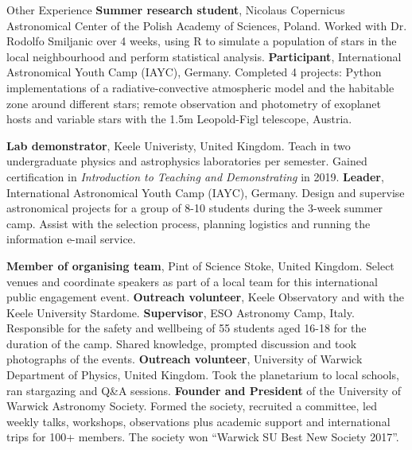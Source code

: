 \begin{rubric}{Other Experience}
\entry*[2017]%
    \textbf{Summer research student}, Nicolaus Copernicus Astronomical Center of the Polish Academy of Sciences, Poland. Worked with Dr. Rodolfo Smiljanic over 4 weeks, using R to simulate a population of stars in the local neighbourhood and perform statistical analysis.
\entry*[2014 -- 2017]%
    \textbf{Participant}, International Astronomical Youth Camp (IAYC), Germany. Completed 4 projects: Python implementations of a radiative-convective atmospheric model and the habitable zone around different stars; remote observation and photometry of exoplanet hosts and variable stars with the 1.5m Leopold-Figl telescope, Austria.
    
%
    \textbf{Lab demonstrator}, Keele Univeristy, United Kingdom. Teach in two undergraduate physics and astrophysics laboratories per semester. Gained certification in \emph{Introduction to Teaching and Demonstrating} in 2019.
%
    \textbf{Leader}, International Astronomical Youth Camp (IAYC), Germany. Design and supervise astronomical projects for a group of 8-10 students during the 3-week summer camp. Assist with the selection process, planning logistics and running the information e-mail service.

%
    \textbf{Member of organising team}, Pint of Science Stoke, United Kingdom. Select venues and coordinate speakers as part of a local team for this international public engagement event.
%
    \textbf{Outreach volunteer}, Keele Observatory and with the Keele University Stardome. 
\entry*[2017 -- 2019]%
    \textbf{Supervisor}, ESO Astronomy Camp, Italy. Responsible for the safety and wellbeing of 55 students aged 16-18 for the duration of the camp. Shared knowledge, prompted discussion and took photographs of the events.
\entry*[2017 -- 2018]%
    \textbf{Outreach volunteer}, University of Warwick Department of Physics, United Kingdom. Took the planetarium to local schools, ran stargazing and Q\&A sessions.
\entry*[2016 -- 2018]%
    \textbf{Founder and President} of the University of Warwick Astronomy Society. Formed the society, recruited a committee, led weekly talks, workshops, observations plus academic support and international trips for 100+ members. The society won “Warwick SU Best New Society 2017”.
\end{rubric}